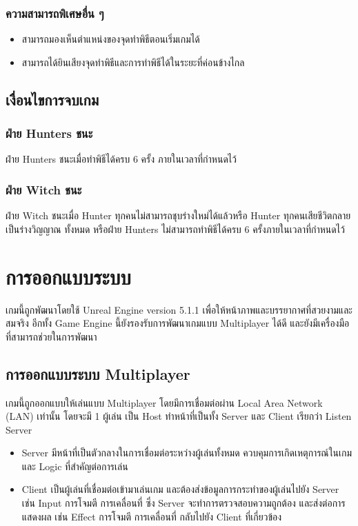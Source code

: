 \subsubsection{ความสามารถพิเศษอื่น ๆ}

\begin{itemize}
  \item สามารถมองเห็นตำแหน่งของจุดทำพิธีตอนเริ่มเกมได้
  \item สามารถได้ยินเสียงจุดทำพิธีและการทำพิธีได้ในระยะที่ค่อนข้างไกล
\end{itemize}


\subsection{เงื่อนไขการจบเกม}

\subsubsection{ฝ่าย Hunters ชนะ}

ฝ่าย Hunters ชนะเมื่อทำพิธีได้ครบ 6 ครั้ง ภายในเวลาที่กำหนดไว้

\subsubsection{ฝ่าย Witch ชนะ} 

ฝ่าย Witch ชนะเมื่อ Hunter ทุกคนไม่สามารถชุบร่างใหม่ได้แล้วหรือ Hunter ทุกคนเสียชีวิตกลายเป็นร่างวิญญาณ
ทั้งหมด หรือฝ่าย Hunters ไม่สามารถทำพิธีได้ครบ 6 ครั้งภายในเวลาที่กำหนดไว้

\section{การออกแบบระบบ}

เกมนี้ถูกพัฒนาโดยใช้ Unreal Engine version 5.1.1 เพื่อให้หน้าภาพและบรรยากาศที่สวยงามและสมจริง
อีกทั้ง Game Engine นี้ยังรองรับการพัฒนาเกมแบบ Multiplayer ได้ดี และยังมีเครื่องมือที่สามารถช่วยในการพัฒนา

\subsection{การออกแบบระบบ Multiplayer}

เกมนี้ถูกออกแบบให้เล่นแบบ Multiplayer โดยมีการเชื่อมต่อผ่าน Local Area Network (LAN) เท่านั้น
โดยจะมี 1 ผู้เล่น เป็น Host ทำหน้าที่เป็นทั้ง Server และ Client เรียกว่า Listen Server
\begin{itemize}
  \item Server มีหน้าที่เป็นตัวกลางในการเชื่อมต่อระหว่างผู้เล่นทั้งหมด ควบคุมการเกิดเหตุการณ์ในเกม และ Logic ที่สำคัญต่อการเล่น
  \item Client เป็นผู้เล่นที่เชื่อมต่อเข้ามาเล่นเกม และต้องส่งข้อมูลการกระทำของผู้เล่นไปยัง Server เช่น Input การโจมตี การเคลื่อนที่ 
  ซึ่ง Server จะทำการตรวจสอบความถูกต้อง และส่งต่อการแสดงผล เช่น Effect การโจมตี การเคลื่อนที่ กลับไปยัง Client ที่เกี่ยวข้อง
\end{itemize}

